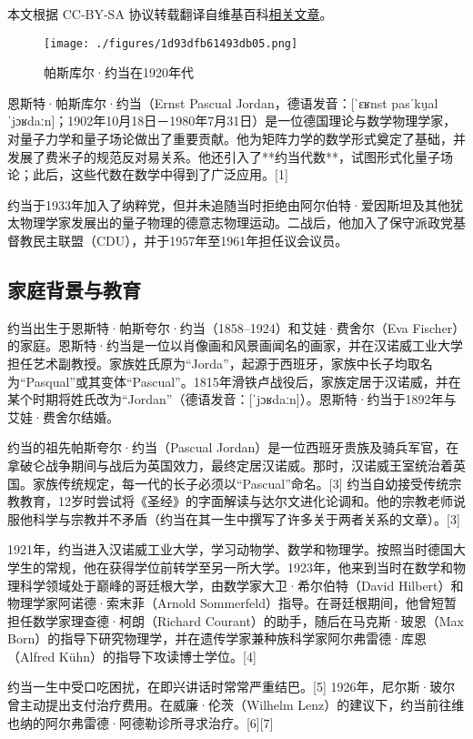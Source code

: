 
本文根据 CC-BY-SA 协议转载翻译自维基百科\href{https://en.wikipedia.org/wiki/Pascual_Jordan}{相关文章}。

\begin{figure}[ht]
\centering
\texttt{[image: ./figures/1d93dfb61493db05.png]}
\caption{帕斯库尔·约当在1920年代} \label{fig_YRD_1}
\end{figure}
恩斯特·帕斯库尔·约当（Ernst Pascual Jordan，德语发音：[ˈɛʁnst pasˈku̯al ˈjɔʁdaːn]；1902年10月18日－1980年7月31日）是一位德国理论与数学物理学家，对量子力学和量子场论做出了重要贡献。他为矩阵力学的数学形式奠定了基础，并发展了费米子的规范反对易关系。他还引入了**约当代数**，试图形式化量子场论；此后，这些代数在数学中得到了广泛应用。[1]

约当于1933年加入了纳粹党，但并未追随当时拒绝由阿尔伯特·爱因斯坦及其他犹太物理学家发展出的量子物理的德意志物理运动。二战后，他加入了保守派政党基督教民主联盟（CDU），并于1957年至1961年担任议会议员。
\subsection{家庭背景与教育}
约当出生于恩斯特·帕斯夸尔·约当（1858–1924）和艾娃·费舍尔（Eva Fischer）的家庭。恩斯特·约当是一位以肖像画和风景画闻名的画家，并在汉诺威工业大学担任艺术副教授。家族姓氏原为“Jorda”，起源于西班牙，家族中长子均取名为“Pasqual”或其变体“Pascual”。1815年滑铁卢战役后，家族定居于汉诺威，并在某个时期将姓氏改为“Jordan”（德语发音：[ˈjɔʁdaːn]）。恩斯特·约当于1892年与艾娃·费舍尔结婚。

约当的祖先帕斯夸尔·约当（Pascual Jordan）是一位西班牙贵族及骑兵军官，在拿破仑战争期间与战后为英国效力，最终定居汉诺威。那时，汉诺威王室统治着英国。家族传统规定，每一代的长子必须以“Pascual”命名。[3] 约当自幼接受传统宗教教育，12岁时尝试将《圣经》的字面解读与达尔文进化论调和。他的宗教老师说服他科学与宗教并不矛盾（约当在其一生中撰写了许多关于两者关系的文章）。[3]

1921年，约当进入汉诺威工业大学，学习动物学、数学和物理学。按照当时德国大学生的常规，他在获得学位前转学至另一所大学。1923年，他来到当时在数学和物理科学领域处于巅峰的哥廷根大学，由数学家大卫·希尔伯特（David Hilbert）和物理学家阿诺德·索末菲（Arnold Sommerfeld）指导。在哥廷根期间，他曾短暂担任数学家理查德·柯朗（Richard Courant）的助手，随后在马克斯·玻恩（Max Born）的指导下研究物理学，并在遗传学家兼种族科学家阿尔弗雷德·库恩（Alfred Kühn）的指导下攻读博士学位。[4]

约当一生中受口吃困扰，在即兴讲话时常常严重结巴。[5] 1926年，尼尔斯·玻尔曾主动提出支付治疗费用。在威廉·伦茨（Wilhelm Lenz）的建议下，约当前往维也纳的阿尔弗雷德·阿德勒诊所寻求治疗。[6][7]
